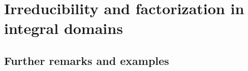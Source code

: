\setcounter{chapter}{4}
\chapter{Irreducibility and factorization in integral domains}
\setcounter{section}{5}
\section{Further remarks and examples}
\setcounter{exercise}{7}
\problem{}{}